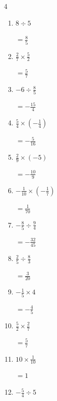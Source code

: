 \begin{multicols}{4}
\begin{enumerate}
        $\displaystyle =\frac{2}{15}$

  \item $\displaystyle 8\div{}5$

        $\displaystyle =\frac{8}{5}$

\columnbreak %

\resetques

  \item $\displaystyle \frac{2}{7}\times{}\frac{5}{2}$

        $\displaystyle =\frac{5}{7}$

  \item $\displaystyle -6\div{}\frac{8}{5}$

        $\displaystyle =-\frac{15}{4}$

  \item $\displaystyle \frac{5}{4}\times{}\left(-\frac{1}{4}\right)$

        $\displaystyle =-\frac{5}{16}$

  \item $\displaystyle \frac{2}{9}\times{}\left(-5\right)$

        $\displaystyle =-\frac{10}{9}$

  \item $\displaystyle -\frac{1}{10}\times{}\left(-\frac{1}{7}\right)$

        $\displaystyle =\frac{1}{70}$

  \item $\displaystyle -\frac{8}{5}\div{}\frac{9}{4}$

        $\displaystyle =-\frac{32}{45}$

  \item $\displaystyle \frac{2}{5}\div{}\frac{8}{3}$

        $\displaystyle =\frac{3}{20}$

  \item $\displaystyle -\frac{1}{5}\times{}4$

        $\displaystyle =-\frac{4}{5}$

  \item $\displaystyle \frac{5}{2}\times{}\frac{2}{7}$

        $\displaystyle =\frac{5}{7}$

  \item $\displaystyle 10\times{}\frac{1}{10}$

        $\displaystyle =1$

\columnbreak %

  \item $\displaystyle -\frac{5}{4}\div{}5$


\end{enumerate}
\end{multicols}
